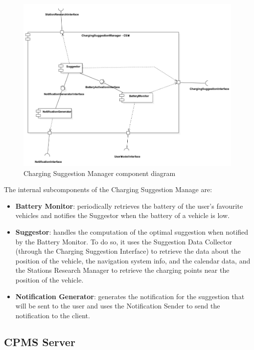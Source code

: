 \documentclass{Configuration_Files/PoliMi3i_thesis}
\begin{document}
\begin{figure}[H]
    \centering
    \includegraphics[width=1\textwidth]{Images/component/ChargingSuggestionManager.jpg}
    \caption{Charging Suggestion Manager component diagram}
\end{figure}

The internal subcomponents of the Charging Suggestion Manage are:
\begin{itemize}
    \item \textbf{Battery Monitor}: periodically retrieves the battery of the user's favourite vehicles and notifies the Suggestor when the battery of a vehicle is low.
    \item \textbf{Suggestor}: handles the computation of the optimal suggestion when notified by the Battery Monitor. To do so, it uses the Suggestion Data Collector (through the Charging Suggestion Interface) to retrieve the data about the position of the vehicle, the navigation system info, and the calendar data, and the Stations Research Manager to retrieve the charging points near the position of the vehicle.
    \item \textbf{Notification Generator}: generates the notification for the suggestion that will be sent to the user and uses the Notification Sender to send the notification to the client.
\end{itemize}

\subsection{CPMS Server}
\end{document}
